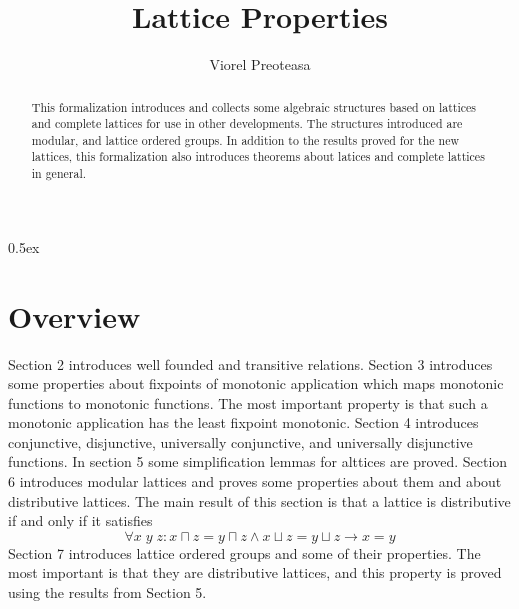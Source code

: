 \documentclass[11pt,a4paper]{article}
\begin{document}
\title{Lattice Properties}

\author{Viorel Preoteasa}

\maketitle

\begin{abstract}
This formalization introduces and collects some algebraic
structures based on lattices and complete lattices for use
in other developments. The structures introduced are modular, 
and lattice ordered groups. In addition to the results proved for 
the new lattices, this formalization also introduces theorems 
about latices and complete lattices in general.
\end{abstract}

\tableofcontents

\parindent 0pt\parskip 0.5ex

\section{Overview}

Section 2 introduces well founded and transitive relations.
Section 3 introduces some properties about fixpoints of
monotonic application which maps monotonic functions to
monotonic functions.  The most important property is that 
such a monotonic application has the least fixpoint monotonic.
Section 4 introduces conjunctive, disjunctive, universally
conjunctive, and universally disjunctive functions. 
In section 5 some simplification lemmas for alttices are proved.
Section 6 introduces modular lattices and proves some properties
about them and about distributive lattices. The main result
of this section is that a lattice is distributive if and only
if it satisfies
$$\forall x \; y \; z: x \sqcap z = y \sqcap z \land  x \sqcup z = y \sqcup z \longrightarrow x = y$$
Section 7 introduces lattice ordered groups and some of their properties.
The most important is that they are distributive lattices, and
this property is proved using the results from Section 5.





\end{document}
